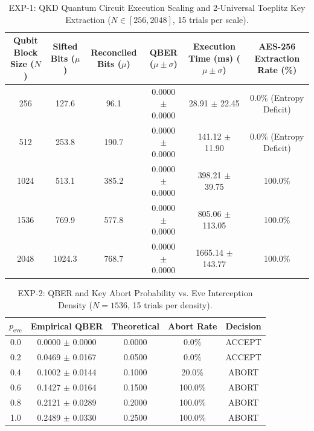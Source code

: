 \documentclass[journal,10pt,twocolumn]{article}
\begin{document}
\begin{table}[t]
\caption{EXP-1: QKD Quantum Circuit Execution Scaling and 2-Universal Toeplitz Key Extraction ($N \in [256, 2048]$, 15 trials per scale).}
\centering
\small
\begin{tabular}{cccccc}
\toprule
\textbf{Qubit Block Size ($N$)} & \textbf{Sifted Bits ($\mu$)} & \textbf{Reconciled Bits ($\mu$)} & \textbf{QBER ($\mu \pm \sigma$)} & \textbf{Execution Time (ms) ($\mu \pm \sigma$)} & \textbf{AES-256 Extraction Rate (\%)} \\
\midrule
256 & 127.6 & 96.1 & 0.0000 $\pm$ 0.0000 & 28.91 $\pm$ 22.45 & 0.0\% (Entropy Deficit) \\
512 & 253.8 & 190.7 & 0.0000 $\pm$ 0.0000 & 141.12 $\pm$ 11.90 & 0.0\% (Entropy Deficit) \\
1024 & 513.1 & 385.2 & 0.0000 $\pm$ 0.0000 & 398.21 $\pm$ 39.75 & 100.0\% \\
1536 & 769.9 & 577.8 & 0.0000 $\pm$ 0.0000 & 805.06 $\pm$ 113.05 & 100.0\% \\
2048 & 1024.3 & 768.7 & 0.0000 $\pm$ 0.0000 & 1665.14 $\pm$ 143.77 & 100.0\% \\
\bottomrule
\end{tabular}
\label{tab:exp1}
\end{table}

\begin{table}[t]
\caption{EXP-2: QBER and Key Abort Probability vs. Eve Interception Density ($N=1536$, 15 trials per density).}
\centering
\small
\begin{tabular}{ccccc}
\toprule
$p_{\text{eve}}$ & \textbf{Empirical QBER} & \textbf{Theoretical} & \textbf{Abort Rate} & \textbf{Decision} \\
\midrule
0.0 & 0.0000 $\pm$ 0.0000 & 0.0000 & 0.0\% & ACCEPT \\
0.2 & 0.0469 $\pm$ 0.0167 & 0.0500 & 0.0\% & ACCEPT \\
0.4 & 0.1002 $\pm$ 0.0144 & 0.1000 & 20.0\% & ABORT \\
0.6 & 0.1427 $\pm$ 0.0164 & 0.1500 & 100.0\% & ABORT \\
0.8 & 0.2121 $\pm$ 0.0289 & 0.2000 & 100.0\% & ABORT \\
1.0 & 0.2489 $\pm$ 0.0330 & 0.2500 & 100.0\% & ABORT \\
\bottomrule
\end{tabular}
\label{tab:exp2}
\end{table}
\end{document}

